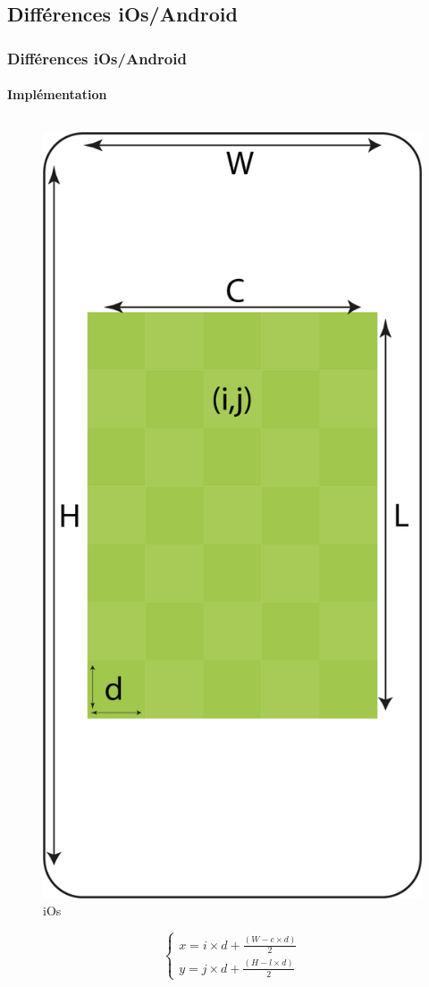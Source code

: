 \documentclass{beamer}
\begin{document}
\subsection{Différences iOs/Android}
\begin{frame}
  \frametitle{Différences iOs/Android}
    \framesubtitle{Implémentation}
    \begin{columns}
        \begin{column}{0.4\linewidth}
            \begin{figure}[H]
                \centering
                \includegraphics[width=0.5\linewidth]{Ressources/CentrageGrille_iOs.png}
                \caption{iOs}
            \end{figure}
            \tiny
            $$
            \left\{
                \begin{array}{ll}
                    x=i\times d+\frac{(W-c\times d)}{2} \\
                    y=j\times d+\frac{(H-l\times d)}{2}
                \end{array}
            \right.
            $$
        \end{column}
        

\end{columns}
\end{frame}
\end{document}
